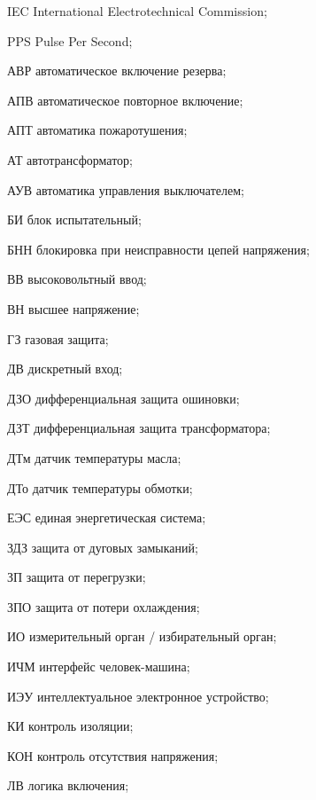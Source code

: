 \begin{list}{}%
{%
  \setlength{\labelwidth}{\abbrwidth}%
  \setlength{\labelsep}{0pt}%
  \setlength{\leftmargin}{\dimexpr\labelwidth+\labelsep\relax}%
  \setlength{\itemindent}{0pt}%
  \setlength{\parsep}{0pt}%
  \setlength{\itemsep}{0pt}
  \renewcommand{\makelabel}[1]{#1 --\hspace{\abbrgap}}%
}
\item[IEC]  International Electrotechnical Commission;
\item[PPS] Pulse Per Second;
\item[АВР] автоматическое включение резерва;
\item[АПВ] автоматическое повторное включение;
\item[АПТ] автоматика пожаротушения;
\item[АТ] автотрансформатор;
\item[АУВ] автоматика управления выключателем;
\item[БИ] блок испытательный;
\item[БНН] блокировка при неисправности цепей напряжения;
\item[ВВ] высоковольтный ввод;
\item[ВН] высшее напряжение;
\item[ГЗ] газовая защита;
\item[ДВ] дискретный вход;
\item[ДЗО] дифференциальная защита ошиновки;
\item[ДЗТ] дифференциальная защита трансформатора;
\item[ДТм] датчик температуры масла;
\item[ДТо] датчик температуры обмотки;
\item[ЕЭС] единая энергетическая система;
\item[ЗДЗ] защита от дуговых замыканий;
\item[ЗП] защита от перегрузки;
\item[ЗПО] защита от потери охлаждения;
\item[ИО] измерительный орган / избирательный орган;
\item[ИЧМ] интерфейс человек-машина;
\item[ИЭУ] интеллектуальное электронное устройство;
\item[КИ] контроль изоляции;
\item[КОН] контроль отсутствия напряжения;
\item[ЛВ] логика включения;

\end{list}
